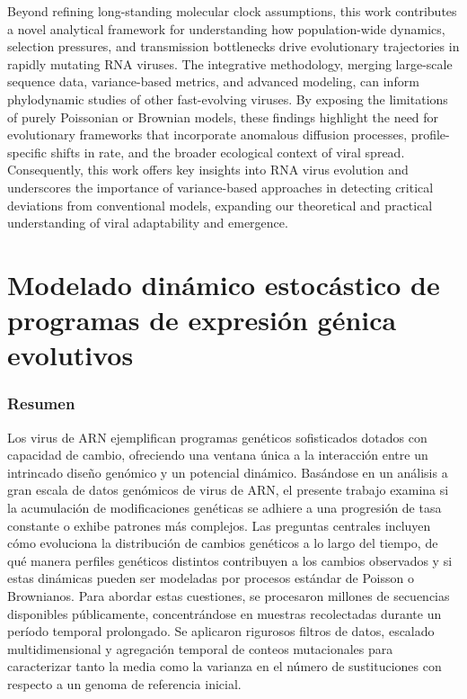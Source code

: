 Beyond refining long-standing molecular clock assumptions, this work contributes a novel analytical framework for understanding how population-wide dynamics, selection pressures, and transmission bottlenecks drive evolutionary trajectories in rapidly mutating RNA viruses. The integrative methodology, merging large-scale sequence data, variance-based metrics, and advanced modeling, can inform phylodynamic studies of other fast-evolving viruses. By exposing the limitations of purely Poissonian or Brownian models, these findings highlight the need for evolutionary frameworks that incorporate anomalous diffusion processes, profile-specific shifts in rate, and the broader ecological context of viral spread. Consequently, this work offers key insights into RNA virus evolution and underscores the importance of variance-based approaches in detecting critical deviations from conventional models, expanding our theoretical and practical understanding of viral adaptability and emergence.


\vfill

\chapter*{\Large Modelado dinámico estocástico de programas de expresión génica evolutivos}

\vspace{-1cm}

\subsection*{\myself}

\subsection*{Resumen}
Los virus de ARN ejemplifican programas genéticos sofisticados dotados con capacidad de cambio, ofreciendo una ventana única a la interacción entre un intrincado diseño genómico y un potencial dinámico. Basándose en un análisis a gran escala de datos genómicos de virus de ARN, el presente trabajo examina si la acumulación de modificaciones genéticas se adhiere a una progresión de tasa constante o exhibe patrones más complejos. Las preguntas centrales incluyen cómo evoluciona la distribución de cambios genéticos a lo largo del tiempo, de qué manera perfiles genéticos distintos contribuyen a los cambios observados y si estas dinámicas pueden ser modeladas por procesos estándar de Poisson o Brownianos. Para abordar estas cuestiones, se procesaron millones de secuencias disponibles públicamente, concentrándose en muestras recolectadas durante un período temporal prolongado. Se aplicaron rigurosos filtros de datos, escalado multidimensional y agregación temporal de conteos mutacionales para caracterizar tanto la media como la varianza en el número de sustituciones con respecto a un genoma de referencia inicial.

